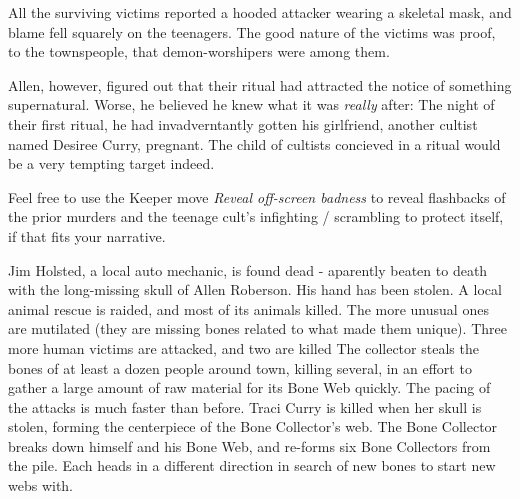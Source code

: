 \documentclass{motw}
\begin{document}
All the surviving victims reported a hooded attacker wearing a skeletal mask, and blame fell squarely on the teenagers.  The good nature of the victims was proof, to the townspeople, that demon-worshipers were among them.

Allen, however, figured out that their ritual had attracted the notice of something supernatural.  Worse, he believed he knew what it was \emph{really} after:  The night of their first ritual, he had invadverntantly gotten his girlfriend, another cultist named Desiree Curry, pregnant. The child of cultists concieved in a ritual would be a very tempting target indeed.


Feel free to use the Keeper move \emph{Reveal off-screen badness} to reveal flashbacks of the prior murders and the teenage cult's infighting / scrambling to protect itself, if that fits your narrative.

\Countdown%
{Jim Holsted, a local auto mechanic, is found dead - aparently beaten to death with the long-missing skull of Allen Roberson.  His hand has been stolen.}
{A local animal rescue is raided, and most of its animals killed.  The more unusual ones are mutilated (they are missing bones related to what made them unique).}
{Three more human victims are attacked, and two are killed}
{The collector steals the bones of at least a dozen people around town, killing several, in an effort to gather a large amount of raw material for its Bone Web quickly.  The pacing of the attacks is much faster than before.}
{Traci Curry is killed when her skull is stolen, forming the centerpiece of the Bone Collector's web.}
{The Bone Collector breaks down himself and his Bone Web, and re-forms six Bone Collectors from the pile. Each heads in a different direction in search of new bones to start new webs with.}


\end{document}
